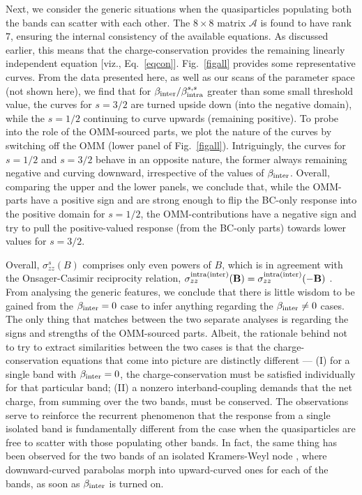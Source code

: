 \documentclass[aps,prb,onecolumn,nofootinbib,citeautoscript,10pt, showkeys]{revtex4-2}
\begin{document}
Next, we consider the generic situations when the quasiparticles populating both the bands can scatter with each other. The $ 8 \times 8$  matrix $ \mathcal{A}$ is found to have rank $7 $, ensuring the internal consistency of the available equations. As discussed earlier, this means that the charge-conservation provides the remaining linearly independent equation [viz., Eq.~\eqref{eqcon}]. Fig.~\ref{figall} provides some representative curves. From the data presented here, as well as our scans of the parameter space (not shown here), we find that for $ \beta_{\rm inter} / \beta_{\rm intra}^{s,s} $ greater than some small threshold value, the curves for $s=3/2$ are turned upside down (into the negative domain), while the $s=1/2$ continuing to curve upwards (remaining positive). To probe into the role of the OMM-sourced parts, we plot the nature of the curves by switching off the OMM (lower panel of Fig.~\ref{figall}). Intriguingly, the curves for $s=1/2$ and $s=3/2$ behave in an opposite nature, the former always remaining negative and curving downward, irrespective of the values of $ \beta_{\rm inter} $. Overall, comparing the upper and the lower panels, we conclude that, while the OMM-parts have a positive sign and are strong enough to flip the BC-only response into the positive domain for $s=1/2$, the OMM-contributions have a negative sign and try to pull the positive-valued response (from the BC-only parts) towards lower values for $s=3/2$.

Overall, $\sigma^s_{zz} (B)$ comprises only even powers of $B$, which is in agreement with the Onsager-Casimir reciprocity relation, $\sigma^{\rm intra(inter)}_{zz} (\mathbf{B})= \sigma^{\rm intra(inter)}_{zz} (-\mathbf{B})$ \cite{onsager31_reciprocal, onsager2, onsager3}.
From analysing the generic features, we conclude that there is little wisdom to be gained from the $\beta_{\rm inter}  = 0 $ case to infer anything regarding the $\beta_{\rm inter}  \neq 0 $ cases. The only thing that matches between the two separate analyses is regarding the signs and strengths of the OMM-sourced parts. Albeit, the rationale behind not to try to extract similarities between the two cases is that the charge-conservation equations that come into picture are distinctly different --- (I) for a single band with $ \beta_{\rm inter}  = 0$, the charge-conservation must be satisfied individually for that particular band; (II) a nonzero interband-coupling demands that the net charge, from summing over the two bands, must be conserved. The observations serve to reinforce the recurrent phenomenon that the response from a single isolated band is fundamentally different from the case when the quasiparticles are free to scatter with those populating other bands. In fact, the same thing has been observed for the two bands of an isolated Kramers-Weyl node \cite{ips-exact-kwn}, where downward-curved parabolas morph into upward-curved ones for each of the bands, as soon as $\beta_{\rm inter}$ is turned on.
\end{document}
